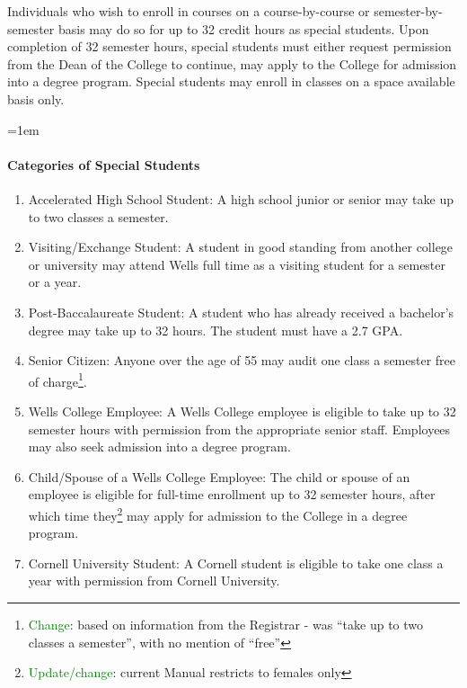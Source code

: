 \documentclass{manual}
\newcommand{\oldbreak}[1]{}
\let\oldparagraph\paragraph
\renewcommand\paragraph{\leftskip=1em\oldparagraph}
\newcommand{\editRemark}[3]{\textcolor{green}{#2}\footnote{\textcolor{green}{#1}: #3}}
\newcommand{\editRemove}[1]{}
\newcommand{\itemLevelA}{\alph*.}
\newcommand{\itemRefA}{\alph*}
\begin{document}
Individuals who wish to enroll in courses on a course-by-course or semester-by-semester basis may do so for up to 32 credit hours as special students. Upon completion of 32 semester hours, special students must either request permission from the Dean of the College to continue, \editRemove{or if they are female,} may apply to the College for admission into a degree program. Special students may enroll in classes on a space available basis only.

\paragraph{Categories of Special Students}\label{par:CategoriesOfSpecialStudents}

\begin{enumerate}[label=\itemLevelA,ref=\itemRefA]

\item Accelerated High School Student: A high school junior or senior may take up to two classes a semester.
\item  Visiting/Exchange Student: A student in good standing from another college or university may attend Wells full time as a visiting student for a semester or a year.
\item  Post-Baccalaureate Student: A student who has already received a bachelor's degree may take up to 32 hours. The student must have a 2.7 GPA.
\item Senior Citizen: Anyone over the age of 55 may audit one class a semester free of charge\editRemark{Change}{}{based on information from the Registrar - was ``take up to two classes a semester'', with no mention of ``free''}.

\oldbreak{X-1}

\item \label{item:employeeClasses} Wells College Employee: A Wells College employee is eligible to take up to 32 semester hours with permission from the appropriate senior staff. Employees may also seek admission into a degree program.

\item \label{item:spouseClasses} Child/Spouse of a Wells College Employee: The child or spouse of an employee is eligible for full-time enrollment up to 32 semester hours, after which time they\editRemark{Update/change}{}{current Manual restricts to females only} may apply for admission to the College in a degree program.

\item Cornell University Student: A Cornell student is eligible to take one class a year with permission from Cornell University.
\end{enumerate}
\end{document}

